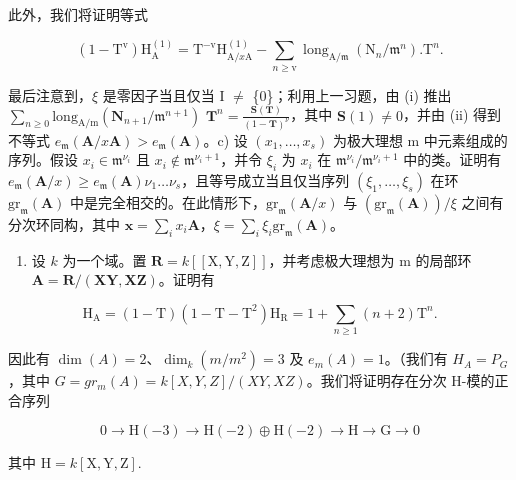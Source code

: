 此外，我们将证明等式

\[
(1 - \mathrm{T} ^ {\mathrm{v}}) \mathrm{H} _ {\mathrm{A}} ^ {(1)} = \mathrm{T} ^ {- \mathrm{v}} \mathrm{H} _ {\mathrm{A} / x \mathrm{A}} ^ {(1)} - \sum_ {n \geqslant \mathrm{v}} \operatorname{long} _ {\mathrm{A} / \mathfrak {m}} (\mathrm{N} _ {n} / \mathfrak {m} ^ {n}). \mathrm{T} ^ {n}.\tag{ii}
\]

最后注意到，\(\xi\) 是零因子当且仅当 I \(\neq\) \{0\}；利用上一习题，由 (i) 推出 \(\sum_{n\geqslant 0}\mathrm{long}_{\mathrm{A / m}}(\mathbf{N}_{n + 1} / \mathfrak{m}^{n + 1})\) \(\mathbf{T}^n = \frac{\mathbf{S}(\mathbf{T})}{(1 - \mathbf{T})^\nu}\)，其中 \(\mathbf{S}(1)\neq 0\)，并由 (ii) 得到不等式 \(e_{\mathfrak{m}}(\mathbf{A} / x\mathbf{A}) > e_{\mathfrak{m}}(\mathbf{A})\)。c) 设 \((x_{1},\dots,x_{s})\) 为极大理想 m 中元素组成的序列。假设 \(x_{i}\in \mathfrak{m}^{\nu_i}\) 且 \(x_{i}\notin \mathfrak{m}^{\nu_i + 1}\)，并令 \(\xi_{i}\) 为 \(x_{i}\) 在 \(\mathfrak{m}^{\nu_i} / \mathfrak{m}^{\nu_i + 1}\) 中的类。证明有 \(e_{\mathfrak{m}}(\mathbf{A} / x)\geqslant e_{\mathfrak{m}}(\mathbf{A})\nu_{1}\dots \nu_{s}\)，且等号成立当且仅当序列 \((\xi_1,\dots,\xi_s)\) 在环 \(\mathrm{gr}_{\mathfrak{m}}(\mathbf{A})\) 中是完全相交的。在此情形下，\(\mathrm{gr}_{\mathfrak{m}}(\mathbf{A} / x)\) 与 \((\mathrm{gr}_{\mathfrak{m}}(\mathbf{A}))/\xi\) 之间有分次环同构，其中 \(\mathbf{x} = \sum_{i}x_{i}\mathbf{A}\)，\(\xi = \sum_{i}\xi_{i}\mathrm{gr}_{\mathfrak{m}}(\mathbf{A})\)。

\begin{enumerate}
\def\labelenumi{\arabic{enumi})}
\setcounter{enumi}{4}
\tightlist
\item
  设 \(k\) 为一个域。置 \(\mathbf{R} = k[[\mathrm{X},\mathrm{Y},\mathrm{Z}]]\)，并考虑极大理想为 m 的局部环 \(\mathbf{A} = \mathbf{R}/(\mathbf{XY},\mathbf{X}\mathbf{Z})\)。证明有
\end{enumerate}

\[
\mathrm{H} _ {\mathrm{A}} = (1 - \mathrm{T}) (1 - \mathrm{T} - \mathrm{T} ^ {2}) \mathrm{H} _ {\mathrm{R}} = 1 + \sum_ {n \geqslant 1} (n + 2) \mathrm{T} ^ {n}.
\]

因此有 \(\dim(A) = 2\)、\(\dim_k(m/m^2) = 3\) 及 \(e_m(A) = 1\)。（我们有 \(H_A = P_G\)，其中 \(G = gr_m(A) = k[X, Y, Z]/(XY, XZ)\)。我们将证明存在分次 H-模的正合序列

\[
0 \rightarrow \mathrm{H} (- 3) \rightarrow \mathrm{H} (- 2) \oplus \mathrm{H} (- 2) \rightarrow \mathrm{H} \rightarrow \mathrm{G} \rightarrow 0
\]

\(\text{其中 } \mathrm{H} = k[\mathrm{X},\mathrm{Y},\mathrm{Z}].\)


